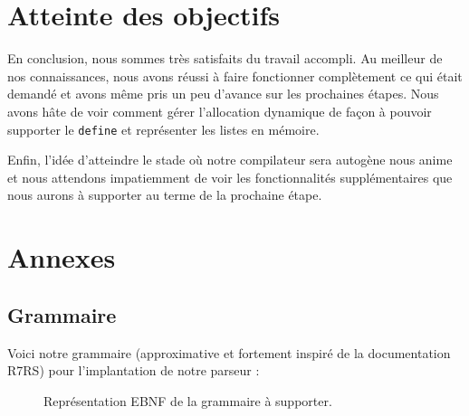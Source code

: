 \documentclass[12pt]{article}
\begin{document}
\section{Atteinte des objectifs}
En conclusion, nous sommes très satisfaits du travail accompli. Au meilleur de nos connaissances, nous avons réussi à faire fonctionner complètement ce qui était demandé et avons même pris un peu d'avance sur les prochaines étapes. Nous avons hâte de voir comment gérer l'allocation dynamique de façon à pouvoir supporter le \texttt{define} et représenter les listes en mémoire.

Enfin, l'idée d'atteindre le stade où notre compilateur sera autogène nous anime et nous attendons impatiemment de voir les fonctionnalités supplémentaires que nous aurons à supporter au terme de la prochaine étape.

\newpage

\section{Annexes}

\subsection{Grammaire}
Voici notre grammaire (approximative et fortement inspiré de la documentation R7RS) pour l'implantation de notre parseur :
\begin{figure}[h!]
  
  \caption{Représentation EBNF de la grammaire à supporter.}
\end{figure}
\end{document}
